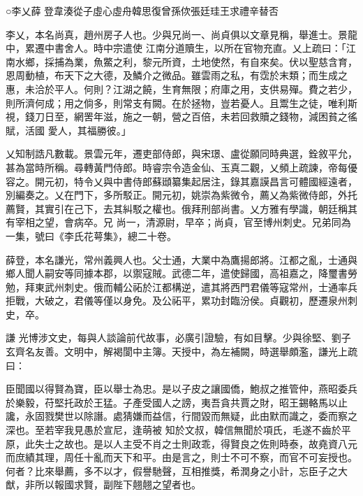 
\begin{pinyinscope}

 ○李乂薛
 登韋湊從子虛心虛舟韓思復曾孫佽張廷珪王求禮辛替否



 李乂，本名尚真，趙州房子人也。少與兄尚一、尚貞俱以文章見稱，舉進士。景龍中，累遷中書舍人。時中宗遣使
 江南分道贖生，以所在官物充直。乂上疏曰：「江南水鄉，採捕為業，魚鱉之利，黎元所資，土地使然，有自來矣。伏以聖慈含育，恩周動植，布天下之大德，及鱗介之微品。雖雲雨之私，有霑於末類；而生成之惠，未洽於平人。何則？江湖之饒，生育無限；府庫之用，支供易殫。費之若少，則所濟何成；用之倘多，則常支有闕。在於拯物，豈若憂人。且鬻生之徒，唯利斯視，錢刀日至，網罟年滋，施之一朝，營之百倍，未若回救贖之錢物，減困貧之徭賦，活國
 愛人，其福勝彼。」



 乂知制誥凡數載。景雲元年，遷吏部侍郎，與宋璟、盧從願同時典選，銓敘平允，甚為當時所稱。尋轉黃門侍郎。時睿宗令造金仙、玉真二觀，乂頻上疏諫，帝每優容之。開元初，特令乂與中書侍郎蘇頲纂集起居注，錄其嘉謨昌言可體國經遠者，別編奏之。乂在門下，多所駁正。開元初，姚崇為紫微令，薦乂為紫微侍郎，外托薦賢，其實引在己下，去其糾駁之權也。俄拜刑部尚書。乂方雅有學識，朝廷稱其有宰相之望，會病卒。兄
 尚一，清源尉，早卒；尚貞，官至博州刺史。兄弟同為一集，號曰《李氏花萼集》，總二十卷。



 薛登，本名謙光，常州義興人也。父士通，大業中為鷹揚郎將。江都之亂，士通與鄉人聞人嗣安等同據本郡，以禦寇賊。武德二年，遣使歸國，高祖嘉之，降璽書勞勉，拜東武州刺史。俄而輔公祏於江都構逆，遣其將西門君儀等寇常州，士通率兵拒戰，大破之，君儀等僅以身免。及公祏平，累功封臨汾侯。貞觀初，歷遷泉州刺史，卒。



 謙
 光博涉文史，每與人談論前代故事，必廣引證驗，有如目擊。少與徐堅、劉子玄齊名友善。文明中，解褐閬中主簿。天授中，為左補闕，時選舉頗濫，謙光上疏曰：



 臣聞國以得賢為寶，臣以舉士為忠。是以子皮之讓國僑，鮑叔之推管仲，燕昭委兵於樂毅，苻堅托政於王猛。子產受國人之謗，夷吾貪共賈之財，昭王錫輅馬以止讒，永固戮樊世以除譖。處猜嫌而益信，行間毀而無疑，此由默而識之，委而察之深也。至若宰我見愚於宣尼，逢萌被
 知於文叔，韓信無聞於項氏，毛遂不齒於平原，此失士之故也。是以人主受不肖之士則政乖，得賢良之佐則時泰，故堯資八元而庶績其理，周任十亂而天下和平。由是言之，則士不可不察，而官不可妄授也。何者？比來舉薦，多不以才，假譽馳聲，互相推獎，希潤身之小計，忘臣子之大猷，非所以報國求賢，副陛下翹翹之望者也。




\end{pinyinscope}
